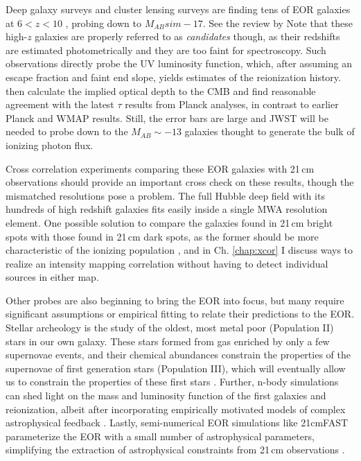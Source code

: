 Deep galaxy surveys and cluster lensing surveys are finding tens of EOR galaxies at $6<z<10$ \citep{Bouwens2011,Illingworth2013,Dunlop2013}, probing down to $M_{AB}sim-17$. See the review by \citet{madau14review} Note that these high-$z$ galaxies are properly referred to as \textit{candidates} though, as their redshifts are estimated photometrically and they are too faint for spectroscopy. Such observations directly probe the UV luminosity function, which, after assuming an escape fraction and faint end slope, yields estimates of the reionization history. \citet{RobertsonReionization2015} then calculate the implied optical depth to the CMB and find reasonable agreement with the latest $\tau$ results from Planck analyses, in contrast to earlier Planck \citep{Robertson2013} and WMAP \citep{hinshaw_et_al_2012} results. Still, the error bars are large and JWST will be needed to probe down to the $M_{AB}\sim-13$ galaxies thought to generate the bulk of ionizing photon flux.

Cross correlation experiments comparing these EOR galaxies with 21\,cm observations should provide an important cross check on these results, though the mismatched resolutions pose a problem. The full Hubble deep field with its hundreds of high redshift galaxies fits easily inside a single MWA resolution element. One possible solution to compare the galaxies found in 21\,cm bright spots with those found in 21\,cm dark spots, as the former should be more characteristic of the ionizing population \citep{beardsley15}, and in Ch. \ref{chap:xcor} I discuss ways to realize an intensity mapping correlation without having to detect individual sources in either map.

Other probes are also beginning to bring the EOR into focus, but many require significant assumptions or empirical fitting to relate their predictions to the EOR. Stellar archeology is the study of the oldest, most metal poor (Population II) stars in our own galaxy. These stars formed from gas enriched by only a few supernovae events, and their chemical abundances constrain the properties of the supernovae of first generation stars (Population III), which will eventually allow us to constrain the properties of these first stars \citep{Frebel2015}. Further, n-body simulations can shed light on the mass and luminosity function of the first galaxies and reionization, albeit after incorporating empirically motivated models of complex astrophysical feedback \citep{Bauer2015,Vogelsberger2014} . Lastly, semi-numerical EOR simulations like 21cmFAST \citep{21cmfast} parameterize the EOR with a small number of astrophysical parameters, simplifying the extraction of astrophysical constraints from 21\,cm observations \citep{PoberNextGen,PoberPAPER64Heating}. 

